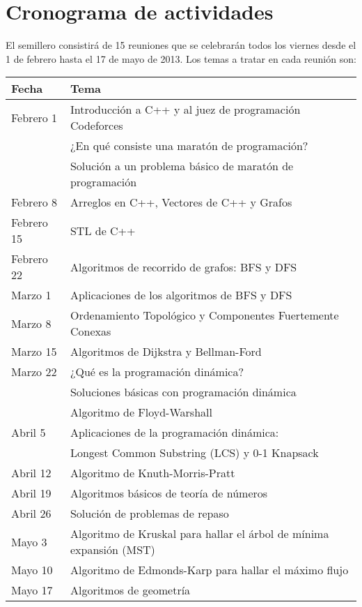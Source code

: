 \documentclass[11pt, oneside]{article}
\theoremstyle{definition}
\theoremstyle{remark}
\begin{document}
\section{Cronograma de actividades}
El semillero consistirá de 15 reuniones que se celebrarán todos los viernes desde el 1 de febrero hasta el 17 de mayo de 2013. Los temas a tratar en cada reunión son: \\ 

\begin{longtable}{|l|l|}
	\hline
	\textbf{Fecha} & \textbf{Tema} \\
	\hline \hline
	Febrero 1 & Introducción a C++ y al juez de programación Codeforces \cite{Codeforces}\\
	          & ¿En qué consiste una maratón de programación?\\
			  & Solución a un problema básico de maratón de programación  \qquad \qquad \qquad \qquad\\
	\hline
	Febrero 8 & Arreglos en C++, Vectores de C++ y Grafos\\
	\hline
	Febrero 15 & STL de C++\\
	\hline
	Febrero 22 & Algoritmos de recorrido de grafos: BFS y DFS\\
	\hline
	Marzo 1 & Aplicaciones de los algoritmos de BFS y DFS\\
	\hline
	Marzo 8 & Ordenamiento Topológico y Componentes Fuertemente Conexas\\
	\hline
	Marzo 15 & Algoritmos de Dijkstra y Bellman-Ford\\
	\hline
	Marzo 22 & ¿Qué es la programación dinámica?\\
	         & Soluciones básicas con programación dinámica\\
	         & Algoritmo de Floyd-Warshall\\
	\hline
	Abril 5 & Aplicaciones de la programación dinámica:\\
	        & Longest Common Substring (LCS) y 0-1 Knapsack\\
	\hline
	Abril 12 & Algoritmo de Knuth-Morris-Pratt\\
	\hline
	Abril 19 & Algoritmos básicos de teoría de números\\
	\hline
	Abril 26 & Solución de problemas de repaso\\
	\hline
	Mayo 3 & Algoritmo de Kruskal para hallar el árbol de mínima expansión (MST)\\
	\hline
	Mayo 10 & Algoritmo de Edmonds-Karp para hallar el máximo flujo\\
	\hline
	Mayo 17 & Algoritmos de geometría\\
	\hline
\end{longtable}
\end{document}
